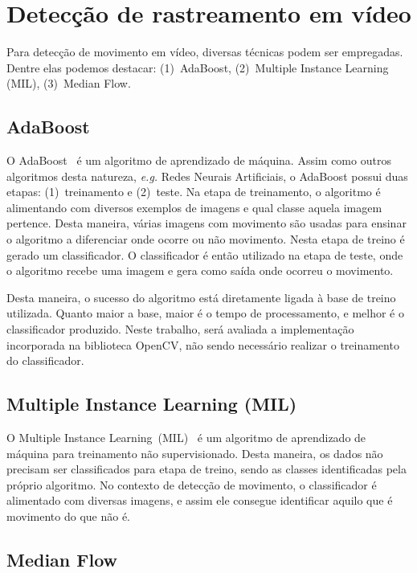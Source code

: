 \documentclass[12pt,oneside,a4paper,chapter=TITLE,section=TITLE,sumario=tradicional]{abntex2}
\begin{document}
\section{Detecção de rastreamento em vídeo}

Para detecção de movimento em vídeo, diversas técnicas podem ser empregadas. Dentre elas podemos destacar: (1)~AdaBoost, (2)~Multiple Instance Learning (MIL), (3)~Median Flow.

\subsection{AdaBoost}

O AdaBoost~\cite{GrabnerGB06} é um algoritmo de aprendizado de máquina. Assim como outros algoritmos desta natureza, \textit{e.g.} Redes Neurais Artificiais, o AdaBoost possui duas etapas: (1)~treinamento e (2)~teste. Na etapa de treinamento, o algoritmo é alimentando com diversos exemplos de imagens e qual classe aquela imagem pertence. Desta maneira, várias imagens com movimento são usadas para ensinar o algoritmo a diferenciar onde ocorre ou não movimento. Nesta etapa de treino é gerado um classificador. O classificador é então utilizado na etapa de teste, onde o algoritmo recebe uma imagem e gera como saída onde ocorreu o movimento.

Desta maneira, o sucesso do algoritmo está diretamente ligada à base de treino utilizada. Quanto maior a base, maior é o tempo de processamento, e melhor é o classificador produzido. Neste trabalho, será avaliada a implementação incorporada na biblioteca OpenCV, não sendo necessário realizar o treinamento do classificador.

\subsection{Multiple Instance Learning (MIL)}

O Multiple Instance Learning~(MIL)~\cite{Babenko09visualtracking} é um algoritmo de aprendizado de máquina para treinamento não supervisionado. Desta maneira, os dados não precisam ser classificados para etapa de treino, sendo as classes identificadas pela próprio algoritmo. No contexto de detecção de movimento, o classificador é alimentado com diversas imagens, e assim ele consegue identificar aquilo que é movimento do que não é.


\subsection{Median Flow}
\end{document}
